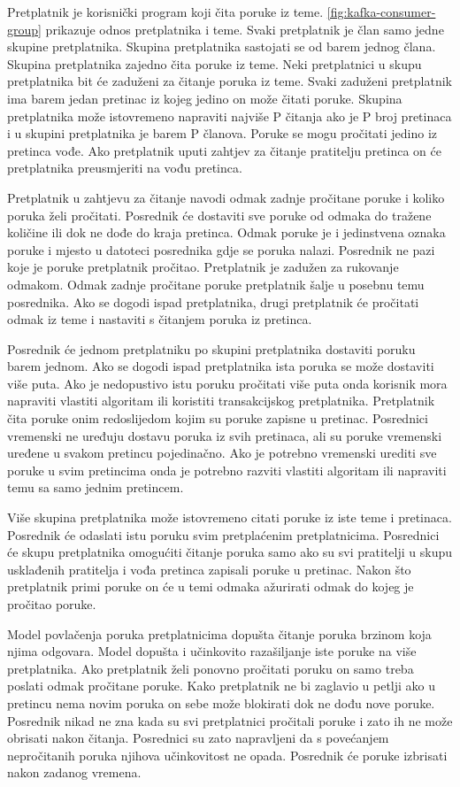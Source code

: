\documentclass[utf8, diplomski, lmodern, numeric]{fer}
\begin{document}
Pretplatnik je korisnički program koji čita poruke iz teme. \ref{fig:kafka-consumer-group} prikazuje odnos pretplatnika i teme. Svaki pretplatnik je član samo jedne skupine pretplatnika. Skupina pretplatnika sastojati se od barem jednog člana. Skupina pretplatnika zajedno čita poruke iz teme. Neki pretplatnici u skupu pretplatnika bit će zaduženi za čitanje poruka iz teme. Svaki zaduženi pretplatnik ima barem jedan pretinac iz kojeg jedino on može čitati poruke. Skupina pretplatnika može istovremeno napraviti najviše P čitanja ako je P broj pretinaca i u skupini pretplatnika je barem P članova. Poruke se mogu pročitati jedino iz pretinca vođe. Ako pretplatnik uputi zahtjev za čitanje pratitelju pretinca on će pretplatnika preusmjeriti na vođu pretinca.

Pretplatnik u zahtjevu za čitanje navodi odmak zadnje pročitane poruke i koliko poruka želi pročitati. Posrednik će dostaviti sve poruke od odmaka do tražene količine ili dok ne dođe do kraja pretinca. Odmak poruke je i jedinstvena oznaka poruke i mjesto u datoteci posrednika gdje se poruka nalazi. Posrednik ne pazi koje je poruke pretplatnik pročitao. Pretplatnik je zadužen za rukovanje odmakom. Odmak zadnje pročitane poruke pretplatnik šalje u posebnu temu posrednika. Ako se dogodi ispad pretplatnika, drugi pretplatnik će pročitati odmak iz teme i nastaviti s čitanjem poruka iz pretinca.

Posrednik će jednom pretplatniku po skupini pretplatnika dostaviti poruku barem jednom. Ako se dogodi ispad pretplatnika ista poruka se može dostaviti više puta. Ako je nedopustivo istu poruku pročitati više puta onda korisnik mora napraviti vlastiti algoritam ili koristiti transakcijskog pretplatnika. Pretplatnik čita poruke onim redoslijedom kojim su poruke zapisne u pretinac. Posrednici vremenski ne uređuju dostavu poruka iz svih pretinaca, ali su poruke vremenski uređene u svakom pretincu pojedinačno. Ako je potrebno vremenski urediti sve poruke u svim pretincima onda je potrebno razviti vlastiti algoritam ili napraviti temu sa samo jednim pretincem.

Više skupina pretplatnika može istovremeno citati poruke iz iste teme i pretinaca. Posrednik će odaslati istu poruku svim pretplaćenim pretplatnicima. Posrednici će skupu pretplatnika omogućiti čitanje poruka samo ako su svi pratitelji u skupu usklađenih pratitelja i vođa pretinca zapisali poruke u pretinac. Nakon što pretplatnik primi poruke on će u temi odmaka ažurirati odmak do kojeg je pročitao poruke.

Model povlačenja poruka pretplatnicima dopušta čitanje poruka brzinom koja njima odgovara. Model dopušta i učinkovito razašiljanje iste poruke na više pretplatnika. Ako pretplatnik želi ponovno pročitati poruku on samo treba poslati odmak pročitane poruke. Kako pretplatnik ne bi zaglavio u petlji ako u pretincu nema novim poruka on sebe može blokirati dok ne dođu nove poruke. Posrednik nikad ne zna kada su svi pretplatnici pročitali poruke i zato ih ne može obrisati nakon čitanja. Posrednici su zato napravljeni da s povećanjem nepročitanih poruka njihova učinkovitost ne opada. Posrednik će poruke izbrisati nakon zadanog vremena.
\end{document}
